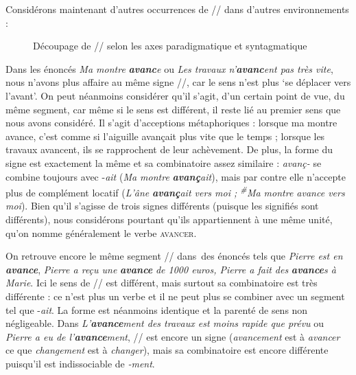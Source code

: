 Considérons maintenant d’autres occurrences de // dans d’autres environnements :

\begin{figure}

\caption{Découpage de // selon les axes paradigmatique et syntagmatique}
\end{figure}

Dans les énoncés \textit{Ma montre} \textbf{\textit{avanc}}\textit{e} ou \textit{Les travaux n’}\textbf{\textit{avanc}}\textit{ent pas très vite}, nous n’avons plus affaire au même signe //, car le sens n’est plus ‘se déplacer vers l’avant’. On peut néanmoins considérer qu’il s’agit, d’un certain point de vue, du même segment, car même si le sens est différent, il reste lié au premier sens que nous avons considéré. Il s’agit d’acceptions métaphoriques : lorsque ma montre avance, c’est comme si l’aiguille avançait plus vite que le temps ; lorsque les travaux avancent, ils se rapprochent de leur achèvement. De plus, la forme du signe est exactement la même et sa combinatoire assez similaire : \textit{avanç-} se combine toujours avec -\textit{ait} (\textit{Ma montre} \textbf{\textit{avanç}}\textit{ait}), mais par contre elle n’accepte plus de complément locatif (\textit{L’âne} \textbf{\textit{avanç}}\textit{ait vers moi ; \textsuperscript{\#}}\textit{Ma montre avance vers moi}). Bien qu’il s’agisse de trois signes différents (puisque les signifiés sont différents), nous considérons pourtant qu’ils appartiennent à une même unité, qu’on nomme généralement le verbe \textsc{avancer}.

On retrouve encore le même segment // dans~des énoncés tels que \textit{Pierre est en} \textbf{\textit{avance}}, \textit{Pierre a reçu une} \textbf{\textit{avance}} \textit{de 1000 euros, Pierre a fait des} \textbf{\textit{avance}}\textit{s à Marie}. Ici le sens de // est différent, mais surtout sa combinatoire est très différente : ce n’est plus un verbe et il ne peut plus se combiner avec un segment tel que -\textit{ait}. La forme est néanmoins identique et la parenté de sens non négligeable. Dans \textit{L’}\textbf{\textit{avance}}\textit{ment des travaux est moins rapide que prévu} ou \textit{Pierre a eu de l’}\textbf{\textit{avance}}\textit{ment}, // est encore un signe (\textit{avancement} est à \textit{avancer} ce que \textit{changement} est à \textit{changer}), mais sa combinatoire est encore différente puisqu’il est indissociable de \textit{{}-ment}.

